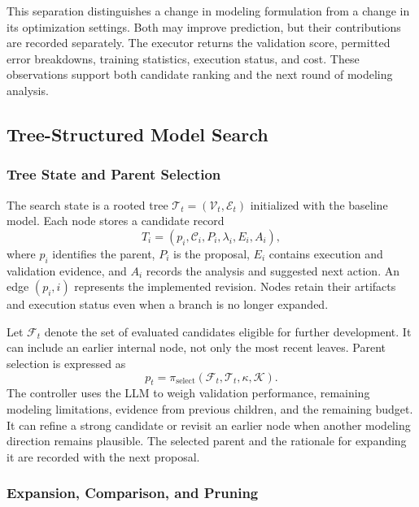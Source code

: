 This separation distinguishes a change in modeling formulation from a change in its optimization settings. Both may improve prediction, but their contributions are recorded separately. The executor returns the validation score, permitted error breakdowns, training statistics, execution status, and cost. These observations support both candidate ranking and the next round of modeling analysis.

\subsection{Tree-Structured Model Search}
\label{sec:trace_guided_exploration}
\label{sec:design_trace}

\subsubsection{Tree State and Parent Selection}

The search state is a rooted tree $\mathcal{T}_t=(\mathcal{V}_t,\mathcal{E}_t)$ initialized with the baseline model. Each node stores a candidate record
\begin{equation}
 T_i=(p_i,\mathcal{C}_i,P_i,\lambda_i,E_i,A_i),
 \label{eq:design_trace}
\end{equation}
where $p_i$ identifies the parent, $P_i$ is the proposal, $E_i$ contains execution and validation evidence, and $A_i$ records the analysis and suggested next action. An edge $(p_i,i)$ represents the implemented revision. Nodes retain their artifacts and execution status even when a branch is no longer expanded.

Let $\mathcal{F}_t$ denote the set of evaluated candidates eligible for further development. It can include an earlier internal node, not only the most recent leaves. Parent selection is expressed as
\begin{equation}
 p_t=\pi_{\mathrm{select}}
 (\mathcal{F}_t,\mathcal{T}_t,\kappa,\mathcal{K}).
 \label{eq:parent_selection}
\end{equation}
The controller uses the LLM to weigh validation performance, remaining modeling limitations, evidence from previous children, and the remaining budget. It can refine a strong candidate or revisit an earlier node when another modeling direction remains plausible. The selected parent and the rationale for expanding it are recorded with the next proposal.

\subsubsection{Expansion, Comparison, and Pruning}


